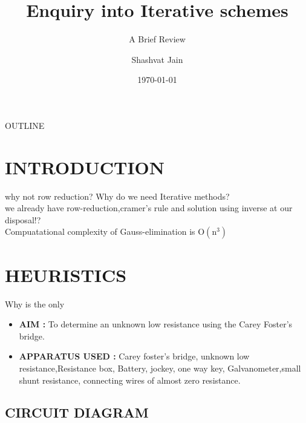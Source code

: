 \documentclass[aspectratio=169]{beamer}
\title{Enquiry into Iterative schemes}
\subtitle{A Brief Review}
\author{Shashvat Jain}
\date{\today}
\begin{document}
	\maketitle
	\begin{frame}{OUTLINE}
		\tableofcontents
	\end{frame}
	\section{INTRODUCTION}
	\begin{frame}{why not row reduction?}
		Why do we need Iterative methods?\\
		we already have row-reduction,cramer's rule and solution using inverse at our disposal!?\\
		Compuatational complexity of Gauss-elimination is $\mathrm{O(n^3)}$ 
	\end{frame}

	\section{HEURISTICS}
	\begin{frame}{Why is the only }
		\begin{itemize}
			\item \textbf{AIM : } To determine an unknown low resistance using the Carey Foster's bridge.
			\item \textbf{APPARATUS USED : } Carey foster's bridge, unknown low resistance,Resistance box, Battery, jockey, one way key, Galvanometer,small shunt resistance, connecting wires of almost zero resistance.
		\end{itemize}
	\end{frame}

	\subsection{CIRCUIT DIAGRAM}

	
\end{document}
